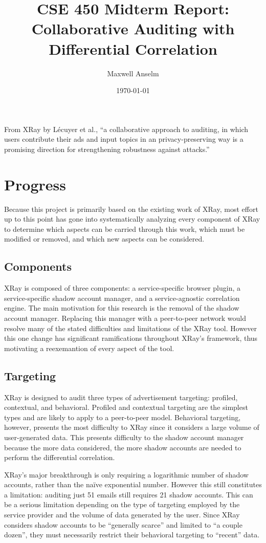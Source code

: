 \documentclass{article}
\title{CSE 450 Midterm Report:\\
Collaborative Auditing with Differential Correlation}
\author{Maxwell Anselm}
\date{\today}
\begin{document}
\maketitle

From XRay by L\'ecuyer et al., ``a collaborative approach to auditing, in which
users contribute their ads and input topics in an privacy-preserving way is a
promising direction for strengthening robustness against attacks.''

\section{Progress}

Because this project is primarily based on the existing work of XRay, most
effort up to this point has gone into systematically analyzing every component
of XRay to determine which aspects can be carried through this work, which
must be modified or removed, and which new aspects can be considered.

\subsection{Components}

XRay is composed of three components: a service-specific browser plugin, a
service-specific shadow account manager, and a service-agnostic correlation
engine. The main motivation for this research is the removal of the shadow
account manager. Replacing this manager with a peer-to-peer network would
resolve many of the stated difficulties and limitations of the XRay tool.
However this one change has significant ramifications throughout XRay's
framework, thus motivating a reexemantion of every aspect of the tool.

\subsection{Targeting}

XRay is designed to audit three types of advertisement targeting: profiled,
contextual, and behavioral. Profiled and contextual targeting are the simplest
types and are likely to apply to a peer-to-peer model. Behavioral targeting,
however, presents the most difficulty to XRay since it considers a large volume
of user-generated data. This presents difficulty to the shadow account manager
because the more data considered, the more shadow accounts are needed to
perform the differential correlation.

XRay's major breakthrough is only requiring a logarithmic number of shadow
accounts, rather than the na\"ive exponential number. However this still
constitutes a limitation: auditing just 51 emails still requires 21 shadow
accounts. This can be a serious limitation depending on the type of targeting
employed by the service provider and the volume of data generated by the user.
Since XRay considers shadow accounts to be ``generally scarce'' and limited to
``a couple dozen'', they must necessarily restrict their behavioral targeting to
``recent'' data.
\end{document}
